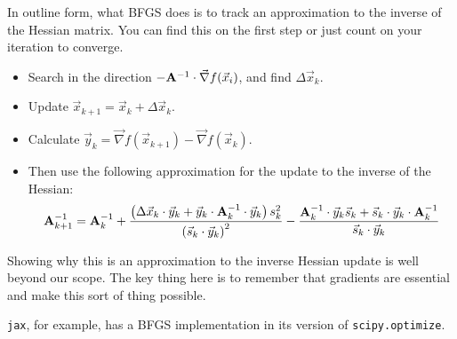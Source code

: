In outline form, what BFGS does is to track an approximation to the
inverse of the Hessian matrix. You can find this on the first step or
just count on your iteration to converge.
\begin{itemize}
 \item Search in the direction
 $-{\bf A}^{-1}\cdot \vec{\nabla}f(\vec{x}_i)$, and find
 $\Delta\vec{x}_k$.
 \item Update $\vec{x}_{k+1} = \vec{x}_k + \Delta\vec{x}_k$.
 \item Calculate $\vec{y}_k = \vec{\nabla}f(\vec{x}_{k+1})
 - \vec{\nabla}f(\vec{x}_k)$.
 \item Then use the following approximation for the update to the
 inverse of the Hessian:
 \begin{equation}
   {\bf A}^{-1}_{k+1} = {\bf A}^{-1}_k +
   \frac{\left(\Delta\vec{x}_k\cdot\vec{y}_k
 + \vec{y}_k\cdot{\bf A}^{-1}_k\cdot\vec{y}_k \right) s_k^2}
   {\left(\vec{s}_k\cdot\vec{y}_k\right)^2}
 - \frac{{\bf A}^{-1}_k\cdot\vec{y}_k\vec{s}_k
 + \vec{s}_k \cdot\vec{y}_k\cdot{\bf A}^{-1}_k}{\vec{s}_k\cdot\vec{y}_k}
 \end{equation}
\end{itemize}

Showing why this is an approximation to the inverse Hessian update is
well beyond our scope. The key thing here is to remember that
gradients are essential and make this sort of thing possible.

{\tt jax}, for example, has a BFGS implementation in its version of
{\tt scipy.optimize}.
